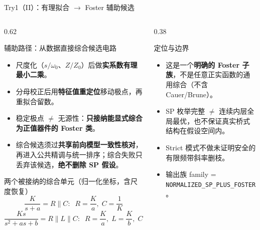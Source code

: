 \documentclass[UTF8,aspectratio=169,10pt]{ctexbeamer}
\begin{document}
\begin{frame}{Try1（II）：有理拟合 $\to$ Foster 辅助候选}
  \begin{columns}
    \begin{column}{0.62\textwidth}
      \begin{block}{辅助路径：从数据直接综合候选电路}
        \begin{itemize}
          \item 尺度化（$s/\omega_0$、$Z/Z_0$）后做\textbf{实系数有理最小二乘}。
          \item 分母校正后用\textbf{特征值重定位}移动极点，再重拟合留数。
          \item 稳定极点 $\ne$ 无源性：\textbf{只接纳能显式综合为正值器件的 Foster 类}。
          \item 综合候选须过\textbf{共享前向模型一致性核对}，再进入公共精调与统一排序；综合失败只丢弃该候选，\textbf{绝不删除 SP 假设}。
        \end{itemize}
      \end{block}
      \begin{block}{两个被接纳的综合单元（归一化坐标，含尺度恢复）}
        {\small
        \[
          \frac{K}{s+a}=R\parallel C:\;\; R=\frac{K}{a},\;C=\frac{1}{K}
        \]
        \[
          \frac{Ks}{s^2+as+b}=R\parallel L\parallel C:\;\; R=\frac{K}{a},\;L=\frac{K}{b},\;C=\frac{1}{K}
        \]}
      \end{block}
    \end{column}
    \begin{column}{0.38\textwidth}
      \begin{block}{定位与边界}
        \begin{itemize}
          \item 这是一个\textbf{明确的 Foster 子族}，不是任意正实函数的通用综合（不含 Cauer/Brune）。
          \item SP 枚举完整 $\ne$ 连续内层全局最优，也不保证真实桥式结构在假设空间内。
          \item Strict 模式不做未证明安全的有限频带斜率删枝。
          \item 输出族 family = \texttt{NORMALIZED\_SP\_PLUS\_FOSTER}。
        \end{itemize}
      \end{block}
    \end{column}
  \end{columns}
\end{frame}
\end{document}
